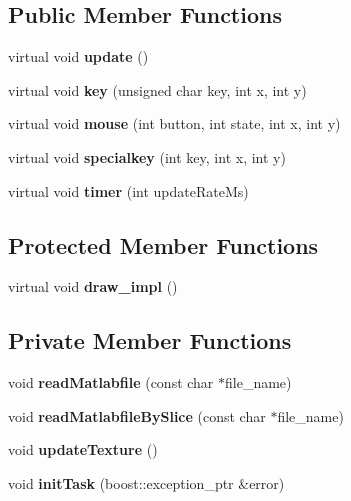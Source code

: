\subsection*{Public Member Functions}
\begin{DoxyCompactItemize}
\item 
virtual void {\bfseries update} ()\label{classSoundfieldViewer_1_1MatlabFieldViewerSimple_ae36157e23dc410a6e70bd0db35cfe4d2}

\item 
virtual void {\bfseries key} (unsigned char key, int x, int y)\label{classSoundfieldViewer_1_1MatlabFieldViewerSimple_a909e8240abd38fa95fa312192b940c70}

\item 
virtual void {\bfseries mouse} (int button, int state, int x, int y)\label{classSoundfieldViewer_1_1MatlabFieldViewerSimple_afa47af8c31e21f8d9a5a5c0dfc26414c}

\item 
virtual void {\bfseries specialkey} (int key, int x, int y)\label{classSoundfieldViewer_1_1MatlabFieldViewerSimple_a2900d158c23eb7732f213c3208597903}

\item 
virtual void {\bfseries timer} (int update\-Rate\-Ms)\label{classSoundfieldViewer_1_1MatlabFieldViewerSimple_a1afa3a53de69ee3b19c9f81d0c8abe3a}

\end{DoxyCompactItemize}
\subsection*{Protected Member Functions}
\begin{DoxyCompactItemize}
\item 
virtual void {\bfseries draw\-\_\-impl} ()\label{classSoundfieldViewer_1_1MatlabFieldViewerSimple_ad2ceb16fda4c75f22ddbf9619dcd46fd}

\end{DoxyCompactItemize}
\subsection*{Private Member Functions}
\begin{DoxyCompactItemize}
\item 
void {\bfseries read\-Matlabfile} (const char $\ast$file\-\_\-name)\label{classSoundfieldViewer_1_1MatlabFieldViewerSimple_a4ac26566f2b5dcdc82b75826ed341f3d}

\item 
void {\bfseries read\-Matlabfile\-By\-Slice} (const char $\ast$file\-\_\-name)\label{classSoundfieldViewer_1_1MatlabFieldViewerSimple_ad769e94d7fd12a0eecdea5611bd10037}

\item 
void {\bfseries update\-Texture} ()\label{classSoundfieldViewer_1_1MatlabFieldViewerSimple_a7bf85e3d91d148127bf62864f0e410b3}

\item 
void {\bfseries init\-Task} (boost\-::exception\-\_\-ptr \&error)\label{classSoundfieldViewer_1_1MatlabFieldViewerSimple_adcf9513ff887d8435a92c4419b13070e}

\end{DoxyCompactItemize}
